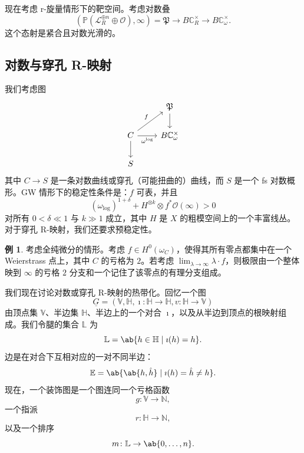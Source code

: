 \documentclass{amsart}
\theoremstyle{definition}
\newtheorem{exm}[thm]{例}
\theoremstyle{remark}
\theoremstyle{plain}
\theoremstyle{definition}
\theoremstyle{remark}
\newcommand{\N}{\mathbb{N}}
\newcommand{\C}{\mathbb{C}}
\newcommand{\E}{\mathbb{E}}
\newcommand{\V}{\mathbb{V}}
\renewcommand{\H}{\mathbb{H}}
\renewcommand{\L}{\mathbb{L}}
\renewcommand{\P}{\mathbb{P}}
\newcommand{\mc}[1]{\mathcal{#1}}
\newcommand{\mf}[1]{\mathfrak{#1}}
\newcommand{\ul}[1]{\underline{#1}}
\newcommand{\1}{\mathbf{1}}
\newcommand{\2}{\mathbf{2}}
\newcommand{\3}{\mathbf{3}}
\begin{document}
现在考虑 r-旋量情形下的靶空间。考虑对数叠
\[ (\P(\mc{L}_R^{\oplus n} \oplus \mc{O}), \infty) = \mf{P} \to B \C_R^{\times} \to B \C_{\omega}^{\times}. \]
这个态射是紧合且对数光滑的。

\subsection{对数与穿孔 R-映射}%
\label{sub:Log and punctured R-maps}

我们考虑图
\begin{equation*}
\begin{tikzcd}
    & \mf{P} \ar{d} \\
    C \ar{ur}{f} \ar{r}[swap]{\omega^{\log}} \ar{d} & B \C_{\omega}^{\times} \\
    S
\end{tikzcd}
\end{equation*}
其中 \(C \to S\) 是一条对数曲线或穿孔（可能扭曲的）曲线，而 \(S\) 是一个 fs 对数概形。GW 情形下的稳定性条件是：\(f\) 可表，并且
\[ (\omega_{\log})^{1+\delta} + H^{\otimes k} \otimes f^* \mc{O}(\infty) > 0 \]
对所有 \(0 < \delta \ll 1\) 与 \(k \gg 1\) 成立，其中 \(H\) 是 \(X\) 的粗模空间上的一个丰富线丛。对于穿孔 R-映射，我们还要求预稳定性。

\begin{exm}
    考虑全纯微分的情形。考虑 \(f \in H^0(\omega_C)\)，使得其所有零点都集中在一个 Weierstrass 点上，其中 \(C\) 的亏格为 \(2\)。若考虑 \(\lim_{\lambda \to \infty} \lambda \cdot f\)，则极限由一个整体映到 \(\infty\) 的亏格 \(2\) 分支和一个记住了该零点的有理分支组成。
\end{exm}

我们现在讨论对数或穿孔 R-映射的热带化。回忆一个图
\[ \ul{G} = (\V, \H, \imath \colon \H \to \H, v \colon \H \to \V) \]
由顶点集 \(\V\)、半边集 \(\H\)、半边上的一个对合 \(\imath\)，以及从半边到顶点的根映射组成。我们令腿的集合 \(\L\) 为
\[ \L = \ab\{ h \in \H \mid \imath(h) = h\}. \]
边是在对合下互相对应的一对不同半边：
\[ \E = \ab\{ \ab\{h, \hat{h}\} \mid \imath(h) = \hat{h} \neq h \}. \]
现在，一个装饰图是一个图连同一个亏格函数
\[ g \colon \V \to \N, \]
一个指派
\[ r \colon \H \to \N, \]
以及一个排序
\[ m \colon \L \to \ab\{0, \ldots, n\}. \]
\end{document}
